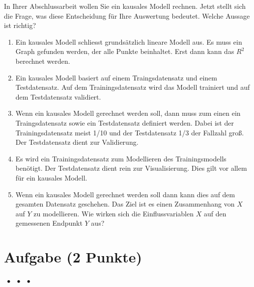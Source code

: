\documentclass[a4paper, 9pt]{scrartcl}\usepackage[]{graphicx}\usepackage[]{xcolor}
\begin{document}
In Ihrer Abschlussarbeit wollen Sie ein kausales Modell rechnen. Jetzt stellt sich die Frage, was diese Entscheidung für Ihre Auswertung bedeutet. Welche Aussage ist richtig?



\begin{enumerate}
\item [\textbf{A} \msquare] Ein kausales Modell schliesst grundsätzlich lineare Modell aus. Es muss ein Graph gefunden werden, der alle Punkte beinhaltet. Erst dann kann das $R^2$ berechnet werden.
\item [\textbf{B} \msquare] Ein kausales Modell basiert auf einem Traingsdatensatz und einem Testdatensatz. Auf dem Trainingsdatensatz wird das Modell trainiert und auf dem Testdatensatz validiert.
\item [\textbf{C} \msquare] Wenn ein kausales Modell gerechnet werden soll, dann muss zum einen ein Traingsdatensatz sowie ein Testdatensatz definiert werden. Dabei ist der Trainingsdatensatz meist 1/10 und der Testdatensatz 1/3 der Fallzahl groß. Der Testdatensatz dient zur Validierung.
\item [\textbf{D} \msquare] Es wird ein Trainingsdatensatz zum Modellieren des Trainingsmodells benötigt. Der Testdatensatz dient rein zur Visualisierung. Dies gilt vor allem für ein kausales Modell.
\item [\textbf{E} \msquare] Wenn ein kausales Modell gerechnet werden soll dann kann dies auf dem gesamten Datensatz geschehen. Das Ziel ist es einen Zusammenhang von $X$ auf $Y$ zu modellieren. Wie wirken sich die Einflussvariablen $X$ auf den gemessenen Endpunkt $Y$ aus?
\end{enumerate}

\section{Aufgabe \hfill (2 Punkte)}

\ifcollection
\begin{flushright}
\tiny\vspace{-2Ex}
\textbf{\examinhaltstart}
\exammodulestat $\;\bullet$
\exammodulestatbbv $\;\bullet$
\exammodulestatversuch $\;\bullet$
\exammodulebiostat
\vspace{-1Ex}
\end{flushright}
\fi
\end{document}
